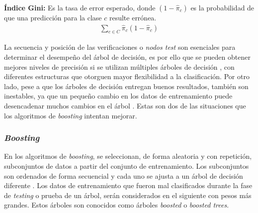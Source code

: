 \textbf{Índice Gini:} Es la tasa de error esperado, donde $(1-\hat{\pi}_c)$ es la probabilidad de que una predicción para la clase $c$ resulte errónea.
\begin{align}
 \sum_{c \in C} \hat{\pi}_c (1-\hat{\pi}_c)
\end{align} 

La secuencia y posición de las verificaciones o \emph{nodos test} son esenciales para determinar el desempeño del árbol de decisión, es por ello que se pueden obtener mejores niveles de precisión si se utilizan múltiples árboles de decisión \cite{Quinlan1996}, con diferentes estructuras que otorguen mayor flexibilidad a la clasificación. 
%
Por otro lado, pese a que los árboles de decisión entregan buenos resultados, también son inestables, ya que un pequeño cambio en los datos de entrenamiento puede desencadenar muchos cambios en el árbol \cite{Roe2005}. 
%
Estas son dos de las situaciones que los algoritmos de \textit{boosting} intentan mejorar. 
%
\subsubsection{\emph{Boosting}}

En los algoritmos de \emph{boosting}, se seleccionan, de forma aleatoria y con repetición, subconjuntos de datos a partir del conjunto de entrenamiento. Los subconjuntos son ordenados de forma secuencial y cada uno se ajusta a un árbol de decisión diferente \cite{James}. Los datos de entrenamiento que fueron mal clasificados durante la fase de \textit{testing} o prueba de un árbol, serán considerados en el siguiente con pesos más grandes. Estos árboles son conocidos como árboles \emph{boosted} o \emph{boosted trees}. 
%

